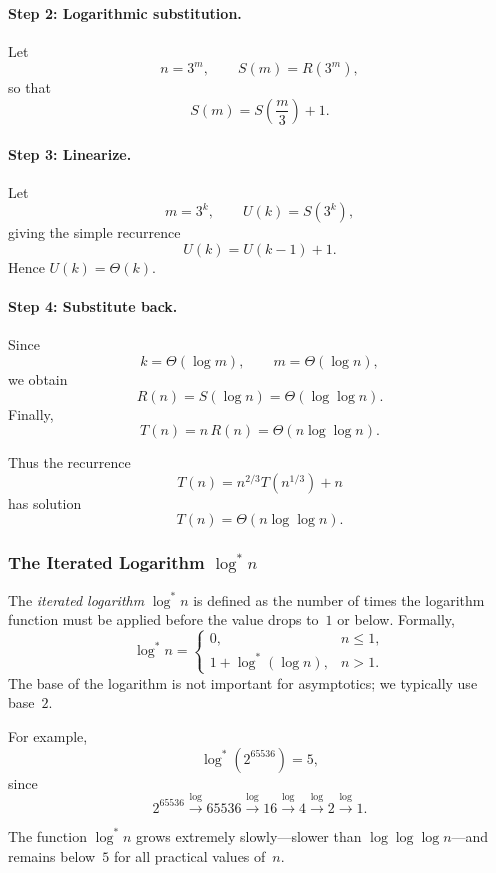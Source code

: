 \documentclass[9pt]{extarticle}
\begin{document}
\paragraph{Step 2: Logarithmic substitution.}
Let
\[
n = 3^{m}, \qquad S(m)=R(3^{m}),
\]
so that
\[
S(m)=S\!\left(\frac{m}{3}\right)+1.
\]

\paragraph{Step 3: Linearize.}
Let
\[
m = 3^{k}, \qquad U(k)=S(3^{k}),
\]
giving the simple recurrence
\[
U(k)=U(k-1)+1.
\]
Hence \(U(k)=\Theta(k)\).

\paragraph{Step 4: Substitute back.}
Since
\[
k=\Theta(\log m),
\qquad
m=\Theta(\log n),
\]
we obtain
\[
R(n)=S(\log n)=\Theta(\log\log n).
\]
Finally,
\[
T(n) = n\,R(n)
= \Theta\!\left(n\log\log n\right).
\]

Thus the recurrence
\[
T(n)=n^{2/3}T(n^{1/3})+n
\]
has solution
\[
T(n)=\Theta\!\left(n\log\log n\right).
\]
\subsubsection{The Iterated Logarithm $\log^{*} n$}

The \emph{iterated logarithm} $\log^{*} n$ is defined as the number of
times the logarithm function must be applied before the value drops to~$1$ or
below.  Formally,
\[
\log^{*} n =
\begin{cases}
0, & n \le 1, \\[4pt]
1 + \log^{*}(\log n), & n > 1.
\end{cases}
\]
The base of the logarithm is not important for asymptotics; we typically
use base~$2$.

For example,
\[
\log^{*}(2^{65536}) = 5,
\]
since
\[
2^{65536} \xrightarrow{\log} 65536
\xrightarrow{\log} 16
\xrightarrow{\log} 4
\xrightarrow{\log} 2
\xrightarrow{\log} 1.
\]

The function $\log^{*} n$ grows extremely slowly---slower than
$\log\log\log n$---and remains below~$5$ for all practical values of~$n$.
\end{document}
